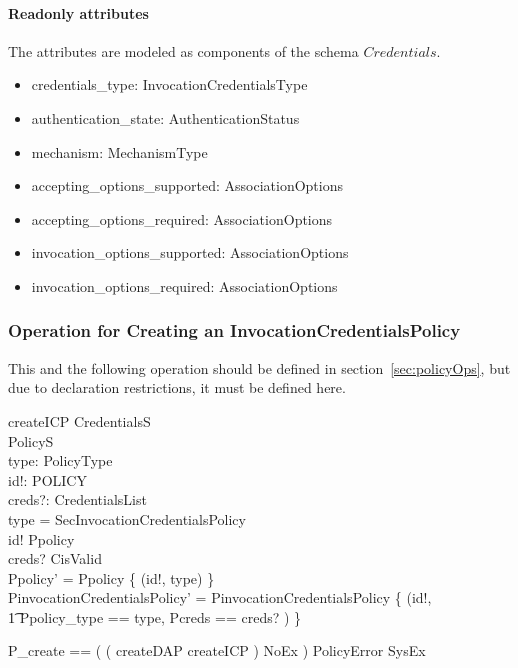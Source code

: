\paragraph{Readonly attributes}
The attributes are modeled as components of the schema $Credentials$.
\begin{itemize}
\item credentials\_type: InvocationCredentialsType
\item authentication\_state: AuthenticationStatus
\item mechanism: MechanismType
\item accepting\_options\_supported: AssociationOptions
\item accepting\_options\_required: AssociationOptions
\item invocation\_options\_supported: AssociationOptions
\item invocation\_options\_required: AssociationOptions
\end{itemize}



\subsubsection{Operation for Creating an InvocationCredentialsPolicy}
\label{sec:createICP}

This and the following operation should be defined in
section~\ref{sec:policyOps}, but due to declaration restrictions, it must be
defined here.
\begin{schema}{createICP}
  CredentialsS \\
  \Delta PolicyS \\
  type: PolicyType \\
  id!: POLICY \\
  creds?: CredentialsList \\
  \where
  type = SecInvocationCredentialsPolicy \\
  id! \notin \dom Ppolicy \\
  \ran creds? \subseteq \dom CisValid \\
  
  Ppolicy' = Ppolicy \cup \{ (id!, type) \} \\
  PinvocationCredentialsPolicy' = PinvocationCredentialsPolicy \cup \{ (id!, \\
  \t1 \lbind Ppolicy\_type == type, Pcreds == creds? \rbind ) \} \\
\end{schema}
\begin{zed}
  P\_create == ( ( createDAP \lor createICP ) \land NoEx ) \lor PolicyError
  \lor SysEx \\ 
\end{zed}



